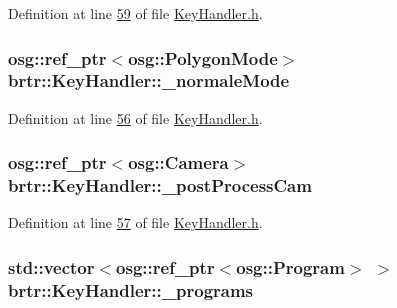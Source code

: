 Definition at line \hyperlink{_key_handler_8h_source_l00059}{59} of file \hyperlink{_key_handler_8h_source}{Key\+Handler.\+h}.

\hypertarget{classbrtr_1_1_key_handler_ae210945e48748029cbea37fde7d601b5}{
\subsubsection[{\+\_\+normale\+Mode}]{\setlength{\rightskip}{0pt plus 5cm}osg\+::ref\+\_\+ptr$<$osg\+::\+Polygon\+Mode$>$ brtr\+::\+Key\+Handler\+::\+\_\+normale\+Mode\hspace{0.3cm}{\ttfamily [private]}}}\label{classbrtr_1_1_key_handler_ae210945e48748029cbea37fde7d601b5}


Definition at line \hyperlink{_key_handler_8h_source_l00056}{56} of file \hyperlink{_key_handler_8h_source}{Key\+Handler.\+h}.

\hypertarget{classbrtr_1_1_key_handler_aa4cc5f6ac9134e473f37968dfb1dd821}{
\subsubsection[{\+\_\+post\+Process\+Cam}]{\setlength{\rightskip}{0pt plus 5cm}osg\+::ref\+\_\+ptr$<$osg\+::\+Camera$>$ brtr\+::\+Key\+Handler\+::\+\_\+post\+Process\+Cam\hspace{0.3cm}{\ttfamily [private]}}}\label{classbrtr_1_1_key_handler_aa4cc5f6ac9134e473f37968dfb1dd821}


Definition at line \hyperlink{_key_handler_8h_source_l00057}{57} of file \hyperlink{_key_handler_8h_source}{Key\+Handler.\+h}.

\hypertarget{classbrtr_1_1_key_handler_a492d086b9458475e595b3627a8dee0f9}{
\subsubsection[{\+\_\+programs}]{\setlength{\rightskip}{0pt plus 5cm}std\+::vector$<$osg\+::ref\+\_\+ptr$<$osg\+::\+Program$>$ $>$ brtr\+::\+Key\+Handler\+::\+\_\+programs\hspace{0.3cm}{\ttfamily [private]}}}\label{classbrtr_1_1_key_handler_a492d086b9458475e595b3627a8dee0f9}


